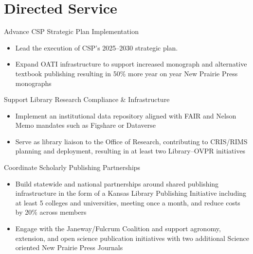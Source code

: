 \ExampleNote

\section{Directed Service}

\LibraryEntry
  {}
  {Advance CSP Strategic Plan Implementation}
  {}
  {}
  {}
  {
  \begin{itemize}
    \item Lead the execution of CSP's 2025--2030 strategic plan.
    \item Expand OATI infrastructure to support increased monograph and alternative textbook publishing resulting in 50\% more year on year New Prairie Press monographs
  \end{itemize}
  }

\LibraryEntry
  {}
  {Support Library Research Compliance \& Infrastructure}
  {}
  {}
  {}
  {
  \begin{itemize}
    \item Implement an institutional data repository aligned with FAIR and Nelson Memo mandates such as Figshare or Dataverse
    \item Serve as library liaison to the Office of Research, contributing to CRIS/RIMS planning and deployment, resulting in at least two Library–OVPR initiatives
  \end{itemize}
  }

\LibraryEntry
  {}
  {Coordinate Scholarly Publishing Partnerships}
  {}
  {}
  {}
  {
  \begin{itemize}
    \item Build statewide and national partnerships around shared publishing infrastructure in the form of a Kansas Library Publishing Initiative including at least 5 colleges and universities, meeting once a month, and reduce costs by 20\% across members
    \item Engage with the Janeway/Fulcrum Coalition and support agronomy, extension, and open science publication initiatives with two additional Science oriented New Prairie Press Journals
  \end{itemize}
  }

